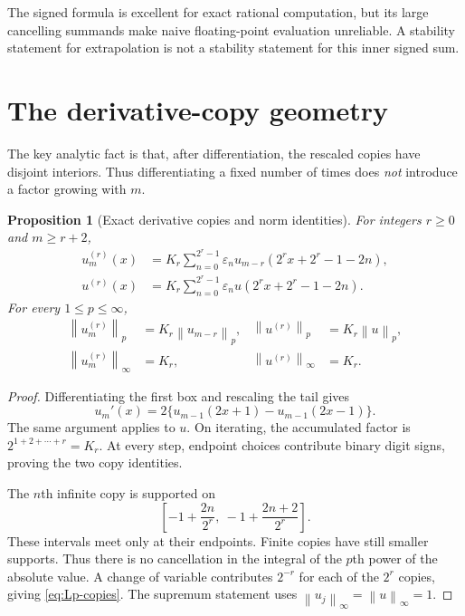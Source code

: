 \documentclass[11pt,a4paper]{article}
\numberwithin{equation}{section}
\newtheorem{proposition}[proposition]{Proposition}
\theoremstyle{definition}
\newcommand{\eps}{\varepsilon}
\newcommand{\norm}[1]{\left\lVert #1\right\rVert}
\begin{document}
The signed formula is excellent for exact rational computation, but
its large cancelling summands make naive floating-point evaluation
unreliable. A stability statement for extrapolation is not a stability
statement for this inner signed sum.

\section{The derivative-copy geometry}\label{sec:derivative}

The key analytic fact is that, after differentiation, the rescaled
copies have disjoint interiors. Thus differentiating a fixed number of
times does \emph{not} introduce a factor growing with $m$.

\begin{proposition}[Exact derivative copies and norm identities]\label{prop:copies}
For integers $r\geq0$ and $m\geq r+2$,
\begin{align}
 u_m^{(r)}(x)
 &=K_r\sum_{n=0}^{2^r-1}\eps_n
       u_{m-r}(2^r x+2^r-1-2n),\label{eq:finite-copies}\\
 u^{(r)}(x)
 &=K_r\sum_{n=0}^{2^r-1}\eps_n
       u(2^r x+2^r-1-2n).\label{eq:infinite-copies}
\end{align}
For every $1\leq p\leq\infty$,
\begin{align}
 \norm{u_m^{(r)}}_p&=K_r\norm{u_{m-r}}_p,
 &\norm{u^{(r)}}_p&=K_r\norm{u}_p,\label{eq:Lp-copies}\\
 \norm{u_m^{(r)}}_\infty&=K_r,
 &\norm{u^{(r)}}_\infty&=K_r.\label{eq:sharp-deriv-norm}
\end{align}
\end{proposition}
\begin{proof}
Differentiating the first box and rescaling the tail gives
\begin{equation}
 u_m'(x)=2\{u_{m-1}(2x+1)-u_{m-1}(2x-1)\}.
 \label{eq:refinement-derivative}
\end{equation}
The same argument applies to $u$. On iterating, the accumulated
factor is $2^{1+2+\cdots+r}=K_r$. At every step, endpoint choices
contribute binary digit signs, proving the two copy identities.

The $n$th infinite copy is supported on
\begin{equation}
 \left[-1+\frac{2n}{2^r},\ -1+\frac{2n+2}{2^r}\right].
\end{equation}
These intervals meet only at their endpoints. Finite copies have still
smaller supports. Thus there is no cancellation in the integral of the
$p$th power of the absolute value. A change of variable contributes
$2^{-r}$ for each of the $2^r$ copies, giving
\eqref{eq:Lp-copies}. The supremum statement uses
$\norm{u_j}_\infty=\norm{u}_\infty=1$.
\end{proof}
\end{document}
